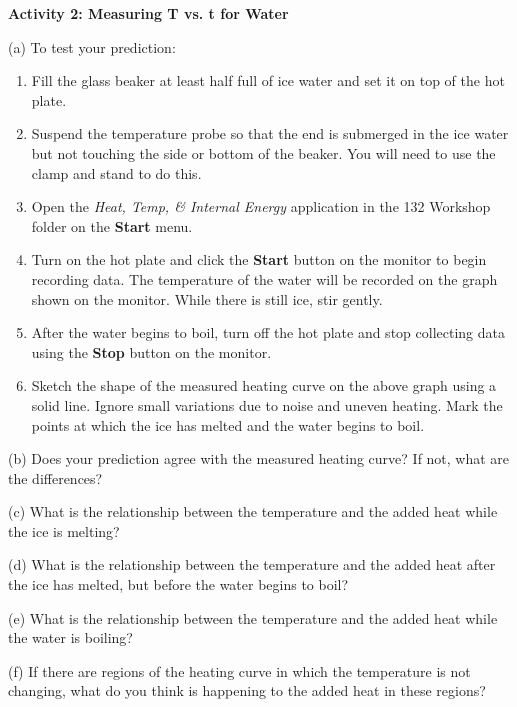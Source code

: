 \textbf{Activity 2: Measuring T vs. t for Water} 

(a) To test your prediction: 

\begin{enumerate}
\item Fill the glass beaker at least half full of ice water and set it on top of the hot plate.
\item Suspend the temperature probe so that the end is submerged in the ice water but not touching the side or bottom of the beaker. You will need to use the clamp and stand to do this.
\item Open the \textit{Heat, Temp, \& Internal Energy} application in the
132 Workshop folder on the {\bf Start} menu.
\item Turn on the hot plate and click the
\textbf{Start} button on the monitor to begin recording data. The temperature of the water will be recorded on the graph shown on the monitor. While there is still ice, stir gently. 
\item After the water begins to boil, turn off the hot plate and stop collecting data using the \textbf{Stop} button on the monitor. 
\item Sketch the shape of the measured heating curve on the above graph
using a solid line. Ignore small variations due to noise and uneven
heating. Mark the points at which the ice has melted and the water
begins to boil.
\end{enumerate}
(b) Does your prediction agree with the measured heating curve? If
not, what are the differences?
\vspace{20mm}

(c) What is the relationship between the temperature and the added
heat while the ice is melting?
\vspace{20mm}

(d) What is the relationship between the temperature and the added
heat after the ice has melted, but before the water begins to boil?
\vspace{20mm}

(e) What is the relationship between the temperature and the added
heat while the water is boiling?
\vspace{20mm}

(f) If there are regions of the heating curve in which the temperature
is not changing, what do you think is happening to the added heat
in these regions?\vspace{20mm}

